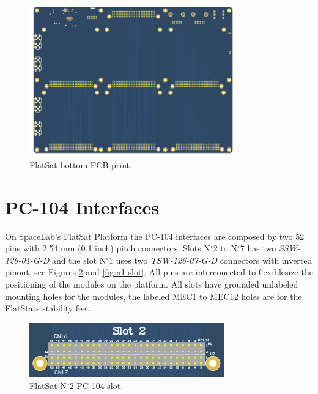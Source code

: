 \begin{figure}[!ht]
    \begin{center}
        \includegraphics[width=0.8\textwidth]{figures/flatsat_bottom_image.png}
        \caption{FlatSat bottom PCB print.}
        \label{fig:pcb-bottom}
    \end{center}
\end{figure}

\section{PC-104 Interfaces}

On SpaceLab's FlatSat Platform the PC-104 interfaces are composed by two 52 pins with 2.54 mm (0.1 inch) pitch connectors. Slots N$^{\circ}$2 to N$^{\circ}$7 has two \textit{SSW-126-01-G-D} and the slot N$^{\circ}$1 uses two \textit{TSW-126-07-G-D} connectors with inverted pinout, see Figures \ref{fig:n2-n7-slots} and \ref{fig:n1-slot}. All pins are interconected to flexiblesize the positioning of the modules on the platform. All slots have grounded unlabeled mounting holes for the modules, the labeled MEC1 to MEC12 holes are for the FlatStats stability feet.

\begin{figure}[!ht]
    \begin{center}
        \includegraphics[width=0.75\textwidth]{figures/pc104_slots_n2_to_n7.png}
        \caption{FlatSat N$^{\circ}$2 PC-104 slot.}
        \label{fig:n2-n7-slots}
    \end{center}
\end{figure}

